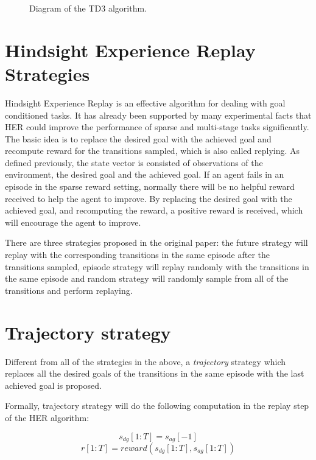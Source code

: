 \documentclass[a4paper, 12pt]{report}
\begin{document}
\begin{figure}
{\begin{tikzpicture}[x=0.75pt,y=0.75pt,yscale=-1,xscale=1]
\end{tikzpicture}
}
\caption{Diagram of the TD3 algorithm.}
\label{td3}
\end{figure}

    \section{Hindsight Experience Replay Strategies}
    Hindsight Experience Replay is an effective algorithm for dealing with goal conditioned tasks\cite{DBLP:journals/corr/AndrychowiczWRS17}. It has already been supported by many experimental facts that HER could improve the performance of sparse and multi-stage tasks significantly. The basic idea is to replace the desired goal with the achieved goal and recompute reward for the transitions sampled, which is also called replying. As defined previously, the state vector is consisted of observations of the environment, the desired goal and the achieved goal. If an agent fails in an episode in the sparse reward setting, normally there will be no helpful reward received to help the agent to improve. By replacing the desired goal with the achieved goal, and recomputing the reward, a positive reward is received, which will encourage the agent to improve.

    There are three strategies proposed in the original paper: the future strategy will replay with the corresponding transitions in the same episode after the transitions sampled, episode strategy will replay randomly with the transitions in the same episode and random strategy will randomly sample from all of the transitions and perform replaying.
    
    \section{Trajectory strategy}

    Different from all of the strategies in the above, a \emph{trajectory} strategy which replaces all the desired goals of the transitions in the same episode with the last achieved goal is proposed. 

    Formally, trajectory strategy will do the following computation in the replay step of the HER algorithm:

    $$ s_{dg}[1:T] = s_{ag}[-1]$$
    $$ r[1:T] = reward(s_{dg}[1:T], s_{ag}[1:T])$$
\end{document}
